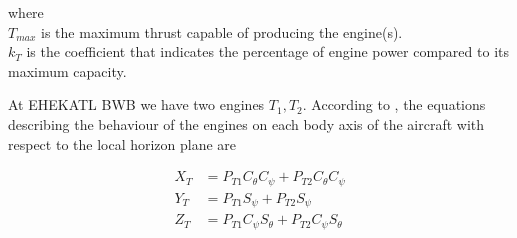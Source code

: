where\\
$T_{max}$ is the maximum thrust capable of producing the engine(s). \\
$k_T$ is the coefficient that indicates the percentage of engine power compared to its maximum capacity.

At EHEKATL BWB we have two engines $T_1 , T_2$. According to \cite{USAF1988}, the equations describing the behaviour of the engines on each body axis of the aircraft with respect to the local horizon plane are

\begin{align}
\label{eq motor 1}
    X_{T} &= P_{T1} C_{\theta} C_{\psi} + P_{T2} C_{\theta} C_{\psi} \\
    Y_{T} &= P_{T1}  S_{\psi} + P_{T2}  S_{\psi}  \\
    Z_{T} &= P_{T1}  C_{\psi} S_{\theta} + P_{T2}  C_{\psi} S_{\theta} 
\label{eq motor 2}
\end{align}


